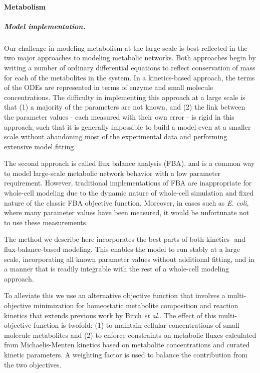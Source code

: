 \documentclass[12pt]{article}
\begin{document}
\baselineskip24pt

\paragraph{Metabolism}
\label{sec:met}

\subparagraph{Model implementation.}
Our challenge in modeling metabolism at the large scale is best reflected in the two major approaches to modeling metabolic networks.  Both approaches begin by writing a number of ordinary differential equations to reflect conservation of mass for each of the metabolites in the system.  In a kinetics-based approach, the terms of the ODEs are represented in terms of enzyme and small molecule concentrations.  The difficulty in implementing this approach at a large scale is that (1) a majority of the parameters are not known, and (2) the link between the parameter values - each measured with their own error - is rigid in this approach, such that it is generally impossible to build a model even at a smaller scale without abandoning most of the experimental data and performing extensive model fitting.

The second approach is called flux balance analysis (FBA), and is a common way to model large-scale metabolic network behavior with a low parameter requirement. However, traditional implementations of FBA are inappropriate for whole-cell modeling due to the dynamic nature of whole-cell simulation and fixed nature of the classic FBA objective function.  Moreover, in cases such as \emph{E. coli}, where many parameter values have been measured, it would be unfortunate not to use these measurements.

The method we describe here incorporates the best parts of both kinetics- and flux-balance-based modeling.  This enables the model to run stably at a large scale, incorporating all known parameter values without additional fitting, and in a manner that is readily integrable with the rest of a whole-cell modeling approach.

To alleviate this we use an alternative objective function that involves a multi-objective minimization for homeostatic metabolite composition and reaction kinetics that extends previous work by Birch \emph{et al.}\cite{Birch:2014ej}. The effect of this multi-objective function is twofold: (1) to maintain cellular concentrations of small molecule metabolites and (2) to enforce constraints on metabolic fluxes calculated from Michaelis-Menten kinetics based on metabolite concentrations and curated kinetic parameters. A weighting factor is used to balance the contribution from the two objectives.
\end{document}
